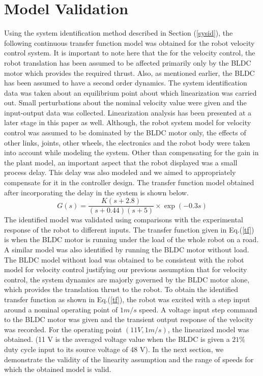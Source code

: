\documentclass[conference]{IEEEtran}
\begin{document}
\section{Model Validation}
Using the system identification method described in Section (\ref{sysid}), the following continuous transfer function model was obtained for the robot velocity control system. It is important to note here that the for the velocity control, the robot translation has been assumed to be affected primarily only by the BLDC motor which provides the required thrust. Also, as mentioned earlier, the BLDC has been assumed to have a second order dynamics. The system identification data was taken about an equilibrium point about which linearization was carried out. Small perturbations about the nominal velocity value were given and the input-output data was collected. Linearization analysis has been presented at a later stage in this paper as well. Although, the robot system model for velocity control was assumed to be dominated by the BLDC motor only, the effects of other links, joints, other wheels, the electronics and the robot body were taken into account while modeling the system. Other than compensating for the gain in the plant model, an important aspect that the robot displayed was a small process delay. This delay was also modeled and we aimed to appropriately compensate for it in the controller design. The transfer function model obtained after incorporating the delay in the system is shown below. 
\begin{equation}
\label{tf}
G(s) = \frac{K(s+2.8)}{(s+0.44)(s+5)} \times \exp(-0.3s)
\end{equation}
The identified model was validated using comparisons with the experimental response of the robot to different inputs. The transfer function given in Eq.(\ref{tf}) is when the BLDC motor is running under the load of the whole robot on a road. A similar model was also identified by running the BLDC motor without load. The BLDC model without load was obtained to be consistent with the robot model for velocity control justifying our previous assumption that for velocity control, the system dynamics are majorly governed by the BLDC motor alone, which provides the translation thrust to the robot. To obtain the identified transfer function as shown in Eq.(\ref{tf}), the robot was excited with a step input around a nominal operating point of $1m/s$ speed. A voltage input step command to the BLDC motor was given and the transient output response of the velocity was recorded. For the operating point $(11V, 1m/s)$, the linearized model was obtained. (11 V is the averaged voltage value when the BLDC is given a $21\%$ duty cycle input to its source voltage of 48 V). In the next section, we demonstrate the validity of the linearity assumption and the range of speeds for which the obtained model is valid. 
\end{document}
